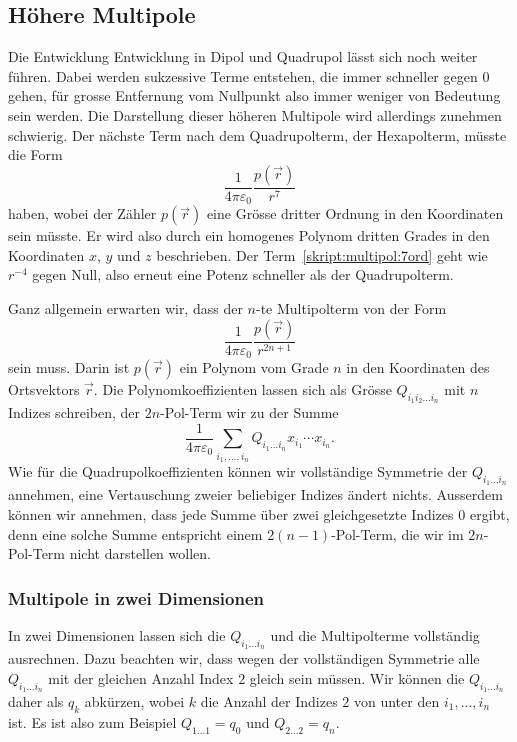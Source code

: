 \subsection{Höhere Multipole}
Die Entwicklung Entwicklung in Dipol und Quadrupol lässt sich noch
weiter führen.
Dabei werden sukzessive Terme entstehen, die immer schneller gegen $0$
gehen, für grosse Entfernung vom Nullpunkt also immer weniger von
Bedeutung sein werden.
Die Darstellung dieser höheren Multipole wird allerdings zunehmen
schwierig. 
Der nächste Term nach dem Quadrupolterm, der Hexapolterm, müsste die Form
\begin{equation}
\frac1{4\pi\varepsilon_0}\frac{p(\vec r)}{r^7}
\label{skript:multipol:7ord}
\end{equation}
haben, wobei der Zähler $p(\vec r)$ eine Grösse dritter Ordnung in
den Koordinaten sein müsste.
Er wird also durch ein homogenes Polynom dritten Grades in den Koordinaten
$x$, $y$ und $z$ beschrieben.
Der Term~\eqref{skript:multipol:7ord} geht wie $r^{-4}$ gegen Null,
also erneut eine Potenz schneller als der Quadrupolterm.

Ganz allgemein erwarten wir, dass der $n$-te Multipolterm von der Form
\[
\frac{1}{4\pi\varepsilon_0} \frac{p(\vec r)}{r^{2n+1}}
\]
sein muss.
Darin ist $p(\vec r)$ ein Polynom vom Grade $n$ in den Koordinaten
des Ortsvektors $\vec r$.
Die Polynomkoeffizienten lassen sich als Grösse $Q_{i_1i_2\dots i_n}$
mit $n$ Indizes schreiben,
der $2n$-Pol-Term wir zu der Summe
\begin{equation}
\frac{1}{4\pi\varepsilon_0}
\sum_{i_1,\dots,i_n} Q_{i_1\dots i_n} x_{i_1}\cdots x_{i_n}.
\label{skript:multipol:npolterm}
\end{equation}
Wie für die Quadrupolkoeffizienten können wir vollständige Symmetrie
der $Q_{i_1\dots i_n}$ annehmen, eine Vertauschung zweier beliebiger
Indizes ändert nichts.
Ausserdem können wir annehmen, dass jede Summe über zwei gleichgesetzte
Indizes $0$ ergibt, denn eine solche Summe entspricht einem $2(n-1)$-Pol-Term,
die wir im $2n$-Pol-Term nicht darstellen wollen.

\subsubsection{Multipole in zwei Dimensionen}
In zwei Dimensionen lassen sich die $Q_{i_1\dots i_n}$ und die Multipolterme
vollständig ausrechnen.
Dazu beachten wir, dass wegen der vollständigen Symmetrie alle 
$Q_{i_1\dots i_n}$ mit der gleichen Anzahl Index $2$ gleich sein
müssen.
Wir können die $Q_{i_1\dots i_n}$ daher als $q_k$ abkürzen, wobei $k$ die
Anzahl der Indizes $2$ von unter den $i_1,\dots,i_n$ ist.
Es ist also zum Beispiel
$Q_{1\dots 1}=q_0$ und $Q_{2\dots 2}=q_n$.

